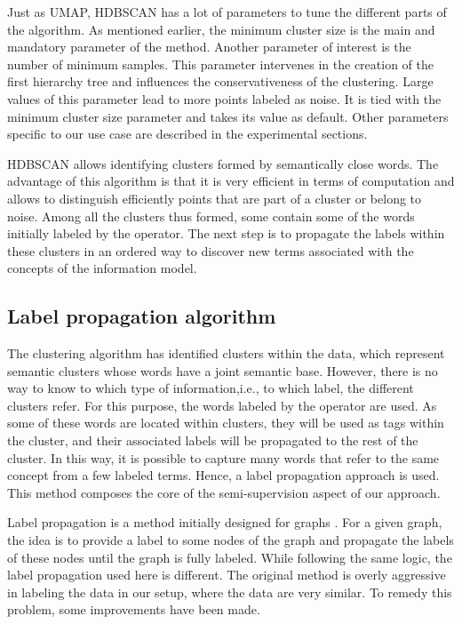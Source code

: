 Just as UMAP, HDBSCAN has a lot of parameters to tune the different parts of the algorithm.
As mentioned earlier, the minimum cluster size is the main and mandatory parameter of the method.
Another parameter of interest is the number of minimum samples.
This parameter intervenes in the creation of the first hierarchy tree and influences the conservativeness of the clustering.
Large values of this parameter lead to more points labeled as noise.
It is tied with the minimum cluster size parameter and takes its value as default.
Other parameters specific to our use case are described in the experimental sections.

HDBSCAN allows identifying clusters formed by semantically close words.
The advantage of this algorithm is that it is very efficient in terms of computation and allows to distinguish efficiently points that are part of a cluster or belong to noise.
Among all the clusters thus formed, some contain some of the words initially labeled by the operator.
The next step is to propagate the labels within these clusters in an ordered way to discover new terms associated with the concepts of the information model.

\subsection{Label propagation algorithm}
The clustering algorithm has identified clusters within the data, which represent semantic clusters whose words have a joint semantic base.
However, there is no way to know to which type of information,i.e., to which label, the different clusters refer.
For this purpose, the words labeled by the operator are used.
As some of these words are located within clusters, they will be used as tags within the cluster, and their associated labels will be propagated to the rest of the cluster.
In this way, it is possible to capture many words that refer to the same concept from a few labeled terms.
Hence, a label propagation approach is used.
This method composes the core of the semi-supervision aspect of our approach.

Label propagation is a method initially designed for graphs \parencite{zhuLearningLabeledUnlabeled2002}.
For a given graph, the idea is to provide a label to some nodes of the graph and propagate the labels of these nodes until the graph is fully labeled.
While following the same logic, the label propagation used here is different.
The original method is overly aggressive in labeling the data in our setup, where the data are very similar.
To remedy this problem, some improvements have been made.

